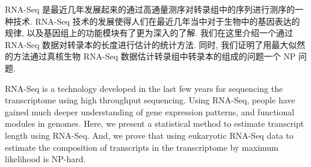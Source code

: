 
\secretlevel{} \secretyear{}

\makeatletter
\ifthu@bachelor\relax\else
  \ifthu@doctor
  \else
    \ifthu@master
    \fi
  \fi
\fi
\makeatother





\begin{cabstract}
	RNA-Seq 是最近几年发展起来的通过高通量测序对转录组中的序列进行测序的一种技术. 
	RNA-Seq 技术的发展使得人们在最近几年当中对于生物中的基因表达的规律, 
	以及基因组上的功能模块有了更为深入的了解. 
	我们在这里介绍一个通过 RNA-Seq 数据对转录本的长度进行估计的统计方法. 
	同时, 我们证明了用最大似然的方法通过真核生物 RNA-Seq 数据估计转录组中转录本的组成的问题一个 NP 问题. 
\end{cabstract}


\begin{eabstract} 
	RNA-Seq is a technology developed in the last few years for sequencing the transcriptome using high throughput sequencing. 
	Using RNA-Seq, people have gained much deeper understanding of gene expression patterns, 
	and functional modules in genomes. 
	Here, we present a statistical method to estimate transcript length using RNA-Seq. 
	And, we prove that using eukaryotic RNA-Seq data to estimate the composition of transcripts in the transcriptome by maximum likelihood is NP-hard.
\end{eabstract}




